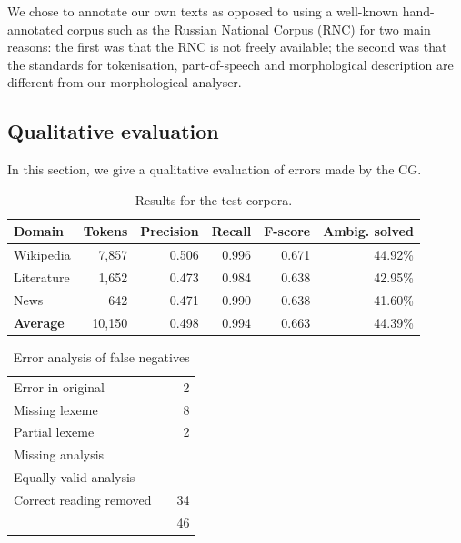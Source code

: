 \documentclass[11pt]{article}
\begin{document}
We chose to annotate our own texts as opposed to using a well-known hand-annotated corpus
such as the Russian National Corpus (RNC) for two main reasons: the first was that the 
RNC is not freely available; the second was that the standards for tokenisation, part-of-speech
and morphological description are different from our morphological analyser.

\subsection{Qualitative evaluation}

In this section, we give a qualitative evaluation of errors made by the CG.

\begin{table}
  \centering
  \begin{tabular}{|l|r|r|r|r|r|}
    \hline
    \textbf{Domain} & \textbf{Tokens} & \textbf{Precision} & \textbf{Recall} & \textbf{F-score} & \textbf{Ambig. solved} \\
    \hline
    Wikipedia       & 7,857      & 0.506        & 0.996    & 0.671 & 44.92\%  \\
    Literature      & 1,652      & 0.473        & 0.984    & 0.638 & 42.95\%  \\
    News            & 642        & 0.471        & 0.990    & 0.638 & 41.60\%  \\
    \hline
    \textbf{Average}& 10,150     & 0.498        &  0.994   & 0.663 & 44.39\% \\
    \hline
  \end{tabular}
  \caption{Results for the test corpora.}
  \label{table:results}
\end{table}


\begin{table}
  \centering
  \begin{tabular}{|l|r|r|}
    
    \hline
    Error in original        &   & 2  \\
    Missing lexeme           &   & 8  \\   %
    Partial lexeme           &   & 2  \\   %
    Missing analysis         &   &    \\   %
    Equally valid analysis   &   &    \\   %
    Correct reading removed  &   & 34 \\   %
    \hline
                             &   & 46 \\
    \hline
  \end{tabular}
  \caption{Error analysis of false negatives}
\end{table}
\end{document}
